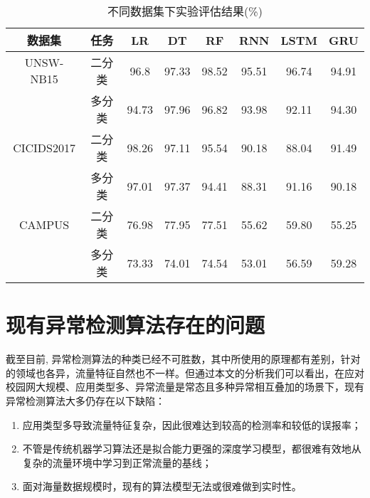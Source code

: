 \begin{table*}[h]
    \small
    \caption{不同数据集下实验评估结果(\%)}
    \label{不同数据集下实验评估结果}
    \centering
    \begin{tabular}{c|c|ccc|ccc}
    \toprule
    
     数据集 &  任务  &  
     LR &  DT & RF & RNN & LSTM & GRU  \\
    \midrule
    
    UNSW-NB15 & 二分类 & 96.8 & 97.33 & 98.52 &  95.51 & 96.74 & 94.91  \\ 
    
    & 多分类 &94.73 & 97.96 & 96.82 & 93.98 & 92.11 & 94.30  \\
    
    \midrule
    CICIDS2017 & 二分类 & 98.26 & 97.11 & 95.54 & 90.18 & 88.04 & 91.49  \\
    & 多分类 & 97.01 & 97.37 & 94.41 & 88.31 & 91.16 & 90.18 \\
    \midrule
    CAMPUS & 二分类 & 76.98 & 77.95 & 77.51 & 55.62 & 59.80 & 55.25 \\
    & 多分类 & 73.33 & 74.01 & 74.54 & 53.01 & 56.59 & 59.28 \\
   
     \bottomrule
    
    \end{tabular}
    \end{table*}


\section{现有异常检测算法存在的问题}
截至目前, 异常检测算法的种类已经不可胜数，其中所使用的原理都有差别，针对的领域也各异，流量特征自然也不一样。但通过本文的分析我们可以看出，在应对校园网大规模、应用类型多、异常流量是常态且多种异常相互叠加的场景下，现有异常检测算法大多仍存在以下缺陷：

\begin{enumerate}
  \item 应用类型多导致流量特征复杂，因此很难达到较高的检测率和较低的误报率；
  \item 不管是传统机器学习算法还是拟合能力更强的深度学习模型，都很难有效地从复杂的流量环境中学习到正常流量的基线；
  \item 面对海量数据规模时，现有的算法模型无法或很难做到实时性。
\end{enumerate}


